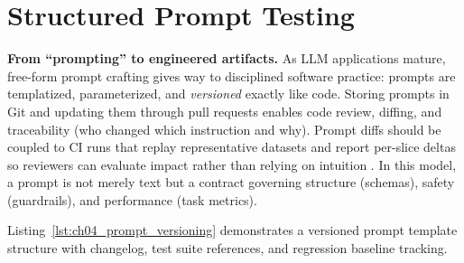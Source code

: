 \section{Structured Prompt Testing}
\label{sec:cicd-structured-prompt-testing}

\noindent\textbf{From ``prompting'' to engineered artifacts.}
As LLM applications mature, free-form prompt crafting gives way to disciplined software practice: prompts are templatized, parameterized, and \emph{versioned} exactly like code. Storing prompts in Git and updating them through pull requests enables code review, diffing, and traceability (who changed which instruction and why). Prompt diffs should be coupled to CI runs that replay representative datasets and report per-slice deltas so reviewers can evaluate impact rather than relying on intuition \cite{promptfoo,openai_evals,lm_harness,mlflow_llm_eval}. In this model, a prompt is not merely text but a contract governing structure (schemas), safety (guardrails), and performance (task metrics).

Listing~\ref{lst:ch04_prompt_versioning} demonstrates a versioned prompt template structure with changelog, test suite references, and regression baseline tracking.

